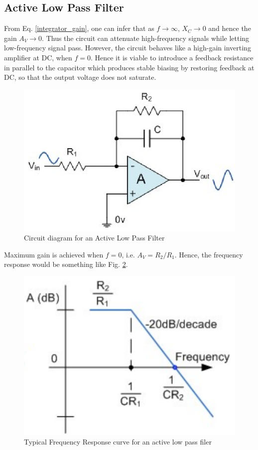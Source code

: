 
\subsection{Active Low Pass Filter}

From Eq. \ref{integrator_gain}, one can infer that as $f \rightarrow \infty$, $X_C \rightarrow 0$ and hence the gain $A_V \rightarrow 0$. Thus the circuit can attenuate high-frequency signals while letting low-frequency signal pass. However, the circuit behaves like a high-gain inverting amplifier at DC, when $f=0$. Hence it is viable to introduce a feedback resistance in parallel to the capacitor which produces stable biasing by restoring feedback at DC, so that the output voltage does not saturate.

\begin{figure}[H]
    \centering
    \includegraphics[width=0.6\columnwidth]{images/lowpass.png}
    \caption{Circuit diagram for an Active Low Pass Filter}
    \label{lowpasscircuit}
\end{figure}

Maximum gain is achieved when $f=0$, i.e. $A_V=R_2/R_1$. Hence, the frequency response would be something like Fig. \ref{lowpassbode}.

\begin{figure}[H]
    \centering
    \includegraphics[width=0.6\columnwidth]{images/lowpassbode.png}
    \caption{Typical Frequency Response curve for an active low pass filer}
    \label{lowpassbode}
\end{figure}

